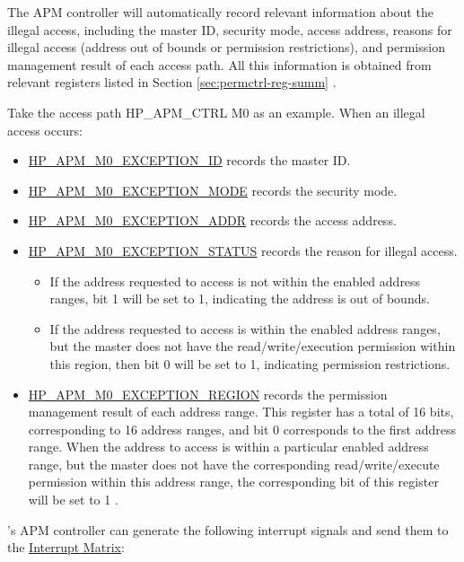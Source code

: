 \documentclass[main\_\_EN.tex]{subfiles}
\begin{document}
The APM controller will automatically record relevant information about the illegal access, including the master ID, security mode, access address, reasons for illegal access (address out of bounds or permission restrictions), and permission management result of each access path. All this information is obtained from relevant registers listed in Section \ref{sec:permctrl-reg-summ} \textit{}.

Take the access path HP\_APM\_CTRL M0 as an example. When an illegal access occurs:

\begin{itemize}
    \item \hyperref[fielddesc:HPAPMM0EXCEPTIONID]{HP\_APM\_M0\_EXCEPTION\_ID} records the master ID.
    \item \hyperref[fielddesc:HPAPMM0EXCEPTIONMODE]{HP\_APM\_M0\_EXCEPTION\_MODE} records the security mode.
    \item \hyperref[fielddesc:HPAPMM0EXCEPTIONADDR]{HP\_APM\_M0\_EXCEPTION\_ADDR} records the access address.
    \item \hyperref[fielddesc:HPAPMM0EXCEPTIONSTATUS]{HP\_APM\_M0\_EXCEPTION\_STATUS} records the reason for illegal access.
    \begin{itemize}
        \item If the address requested to access is not within the enabled address ranges, bit 1 will be set to 1, indicating the address is out of bounds.
        \item If the address requested to access is within the enabled address ranges, but the master does not have the read/write/execution permission within this region, then bit 0 will be set to 1, indicating permission restrictions.
    \end{itemize}

    \item \hyperref[fielddesc:HPAPMM0EXCEPTIONREGION]{HP\_APM\_M0\_EXCEPTION\_REGION} records the permission management result of each address range. This register has a total of 16 bits, corresponding to 16 address ranges, and bit 0 corresponds to the first address range. When the address to access is within a particular enabled address range, but the master does not have the corresponding read/write/execute permission within this address range, the corresponding bit of this register will be set to 1 .

\end{itemize}

\chipname{}'s APM controller can generate the following interrupt signals and send them to the \hyperref[mod:intmtrx]{Interrupt Matrix}:
\end{document}
